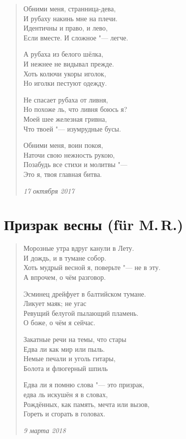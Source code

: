 \documentclass[a4paper,12pt]{article}
\newcommand{\ldotst}{\so{...}\xspace}
\begin{document}
\begin{verse}
 Обними меня, странница-дева,\\
И рубаху накинь мне на плечи.\\
Идентичны и право, и лево,\\
Если вместе. И сложное "--- легче.

А рубаха из белого шёлка,\\
И нежнее не видывал прежде.\\
Хоть колючи укоры иголок,\\
Но иголки пестуют одежду.

Не спасает рубаха от ливня,\\
Но похоже ль, что ливня боюсь я?\\
Моей шее железная гривна,\\
Что твоей "--- изумрудные бусы.

Обними меня, воин покоя,\\
Наточи свою нежность рукою,\\
Позабудь все стихи и молитвы "---\\
Это я, твоя главная битва.

\emph{17 октября 2017}
\end{verse}
\newpage

\section{Призрак весны (f\"{u}r M.\,R.)}

\begin{verse}
Морозные утра вдруг канули в Лету.\\
И дождь, и в тумане собор.\\
Хоть мудрый весной я, поверьте "--- не в эту.\\
А впрочем, о чём разговор.

Эсминец дрейфует в балтийском тумане.\\
Ликует маяк; не угас\\
Ревущий белугой пылающий пламень.\\
О боже, о чём я сейчас.

Закатные речи на темы, что стары\\
Едва ли как мир или пыль.\\
Немые печали и уголь гитары,\\
Болота и флюгерный шпиль\ldotst

Едва ли я помню слова "--- это призрак,\\
едва ль искушён я в словах,\\
Рождённых, как память, мечта или вызов,\\
Гореть и сгорать в головах.

\emph{9 марта 2018}
\end{verse}
\newpage
\end{document}
